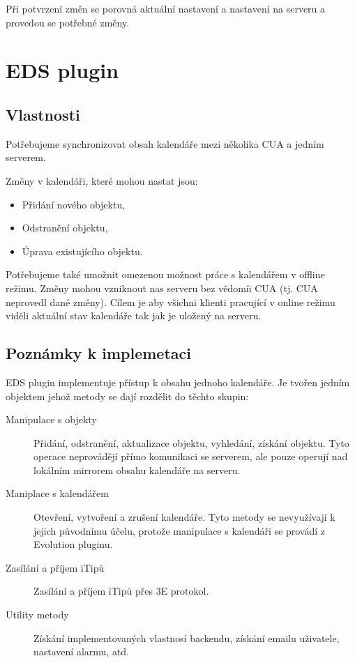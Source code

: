 \documentclass[a4paper,10pt]{article}
\begin{document}
\begin{multicols*}{2}
Při potvrzení změn se porovná aktuální nastavení a nastavení na serveru a
provedou se potřebné změny.

\newpage
\section{EDS plugin}

\subsection{Vlastnosti}

Potřebujeme synchronizovat obsah kalendáře mezi několika CUA a jedním serverem.

Změny v kalendáři, které mohou nastat jsou:
\begin{itemize}
\item Přidání nového objektu,
\item Odstranění objektu,
\item Úprava existujícího objektu.
\end{itemize}

Potřebujeme také umožnit omezenou možnost práce s kalendářem v offline režimu.
Změny mohou vzniknout nas serveru bez vědomíi CUA (tj. CUA neprovedl dané změny).
Cílem je aby všichni klienti pracující v online režimu viděli aktuální stav
kalendáře tak jak je uložený na serveru.

\subsection{Poznámky k implemetaci}

EDS plugin implementuje přístup k obsahu jednoho kalendáře. Je tvořen jedním
objektem jehož metody se dají rozdělit do těchto skupin:
\begin{description}
\item[Manipulace s objekty] Přidání, odstranění, aktualizace objektu, vyhledání,
získání objektu. Tyto operace neprovádějí přímo komunikaci se serverem, ale
pouze operují nad lokálním mirrorem obsahu kalendáře na serveru.
\item[Maniplace s kalendářem] Otevření, vytvoření a zrušení kalendáře. Tyto
metody se nevyužívají k jejich původnímu účelu, protože manipulace s kalendáři
se provádí z Evolution pluginu.
\item[Zasílání a příjem iTipů] Zasílání a příjem iTipů přes 3E protokol.
\item[Utility metody] Získání implementovaných vlastnosí backendu, získání
emailu uživatele, nastavení alarmu, atd.
\end{description}


\end{multicols*}
\end{document}
